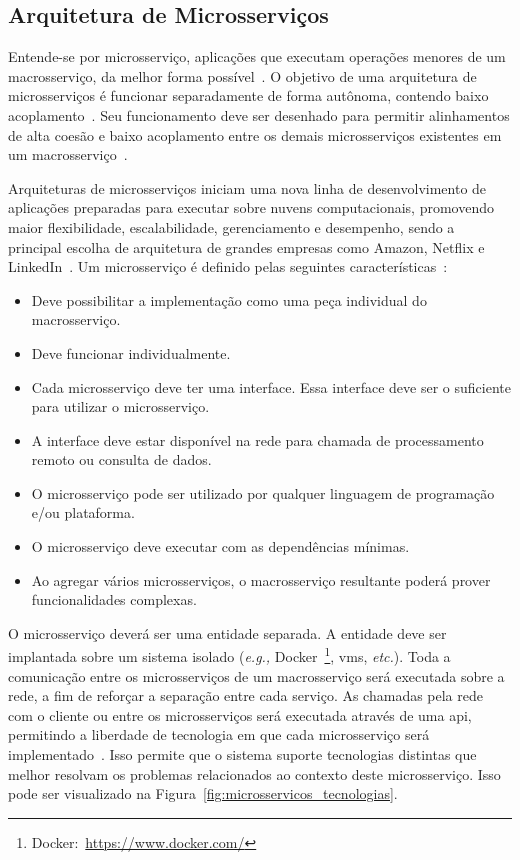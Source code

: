 \subsection{Arquitetura de Microsserviços}
\label{sec:microsservicos}



Entende-se por microsserviço, aplicações que executam operações menores de um macrosserviço, da melhor forma possível~\cite{stephenclarkewillson2017, Newman2015Feb}.
%
O objetivo de uma arquitetura de microsserviços é funcionar separadamente de forma autônoma, contendo baixo acoplamento~\cite{Newman2015Feb}.
%
Seu funcionamento deve ser desenhado para permitir alinhamentos de alta coesão e baixo acoplamento entre os demais microsserviços existentes em um macrosserviço~\cite{8169955}.



Arquiteturas de microsserviços iniciam uma nova linha de desenvolvimento de aplicações preparadas para executar sobre nuvens computacionais, promovendo maior flexibilidade, escalabilidade, gerenciamento e desempenho, sendo a principal escolha de arquitetura de grandes empresas como Amazon, Netflix e LinkedIn~\cite{7830692,7515686}.
%
Um microsserviço é definido pelas seguintes características~\cite{8169955}:



\begin{itemize}
  \item Deve possibilitar a implementação como uma peça individual do macrosserviço.
  \item Deve funcionar individualmente.
  \item Cada microsserviço deve ter uma interface. Essa interface deve ser o suficiente para utilizar o microsserviço.
  \item A interface deve estar disponível na rede para chamada de processamento remoto ou consulta de dados.
  \item O microsserviço pode ser utilizado por qualquer linguagem de programação e/ou plataforma.
  \item O microsserviço deve executar com as dependências mínimas.
  \item Ao agregar vários microsserviços, o macrosserviço resultante poderá prover funcionalidades complexas.
\end{itemize}



O microsserviço deverá ser uma entidade separada.
%
A entidade deve ser implantada sobre um sistema isolado (\textit{e.g.,} Docker~\footnote{Docker:~\url{https://www.docker.com/}}, \acp{vm}, \textit{etc.}).
%
Toda a comunicação entre os microsserviços de um macrosserviço será executada sobre a rede, a fim de reforçar a separação entre cada serviço.
%
As chamadas pela rede com o cliente ou entre os microsserviços será executada através de uma \ac{api}, permitindo a liberdade de tecnologia em que cada microsserviço será implementado~\cite{Newman2015Feb}.
%
Isso permite que o sistema suporte tecnologias distintas que melhor resolvam os problemas relacionados ao contexto deste microsserviço.
%
Isso pode ser visualizado na Figura~\ref{fig:microsservicos_tecnologias}.



